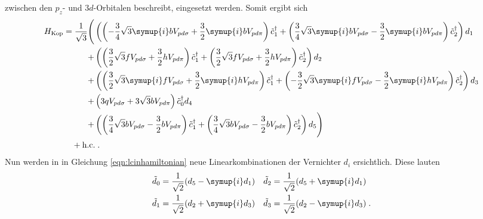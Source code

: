 zwischen den $p_z$- und $3d$-Orbitalen beschreibt, eingesetzt werden.
Somit ergibt sich 
\begin{equation}
    \begin{split}
    H_\text{Kop} = \frac{1}{\sqrt{3}} 
        \Biggl(  &\left ( \left   (-\frac{3}{4}\sqrt{3}   \symup{i}    b   V_{pd\sigma} + \frac{3}{2}  \symup{i}   b   V_{pd\pi} \right ) \tilde{c}^\dagger_1  
                    +\left  ( \frac{3}{4}\sqrt{3}   \symup{i}    b   V_{pd\sigma} - \frac{3}{2}  \symup{i}   b   V_{pd\pi} \right ) \tilde{c}^\dagger_2 \right )            d_1\\
        +&\left (    \left  ( \frac{3}{2}\sqrt{3}                           f   V_{pd\sigma} + \frac{3}{2}              h   V_{pd\pi} \right ) \tilde{c}^\dagger_1          
                    +\left  ( \frac{3}{2}\sqrt{3}                           f   V_{pd\sigma} + \frac{3}{2}              h   V_{pd\pi} \right ) \tilde{c}^\dagger_2 \right ) d_2\\
        +&\left (    \left  ( \frac{3}{2}\sqrt{3}               \symup{i}   f   V_{pd\sigma} + \frac{3}{2}  \symup{i}   h   V_{pd\pi} \right ) \tilde{c}^\dagger_1  
                    +\left  (-\frac{3}{2}\sqrt{3}               \symup{i}   f   V_{pd\sigma} - \frac{3}{2}  \symup{i}   h   V_{pd\pi} \right ) \tilde{c}^\dagger_2 \right ) d_3\\
        +&\left (   3 q V_{pd\sigma} + 3 \sqrt{3}  b V_{pd\pi} \right )    \tilde{c}^\dagger_0                                                                              d_4\\
        +&\left (   \left   ( \frac{3}{4}\sqrt{3}                           b   V_{pd\sigma} - \frac{3}{2}              b   V_{pd\pi} \right ) \tilde{c}^\dagger_1  
                    +\left  ( \frac{3}{4}\sqrt{3}                           b   V_{pd\sigma} - \frac{3}{2}              b   V_{pd\pi} \right ) \tilde{c}^\dagger_2 \right ) d_5 \Biggr) \\
                    & \! \! \! \!  \! \! \! \!  \! \! \! \! \! \! \! \! + \text{h.c.} \; .
                 \end{split}
      \label{eqn:lcinhamiltonian}
\end{equation} 
Nun werden in in Gleichung \eqref{eqn:lcinhamiltonian} neue Linearkombinationen der Vernichter $d_i$ ersichtlich.
Diese lauten 
\begin{equation}
    \begin{aligned}
    \tilde{d}_0 &= \frac{1}{\sqrt{2}} (d_5-\symup{i}d_1) & \tilde{d}_2 &= \frac{1}{\sqrt{2}} (d_5+\symup{i}d_1) \\
    \tilde{d}_1 &= \frac{1}{\sqrt{2}} (d_2+\symup{i}d_3) & \tilde{d}_3 &= \frac{1}{\sqrt{2}} (d_2-\symup{i}d_3) \; . \label{eqn:newdi}
    \end{aligned}
\end{equation}
